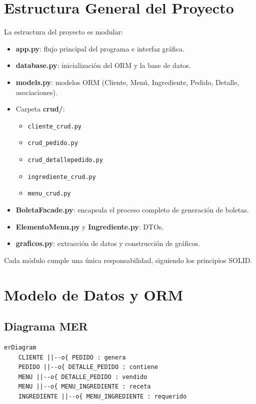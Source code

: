 \documentclass[11pt,letterpaper]{article}
\begin{document}
\section{Estructura General del Proyecto}

La estructura del proyecto es modular:

\begin{itemize}
    \item \textbf{app.py}: flujo principal del programa e interfaz gráfica.
    \item \textbf{database.py}: inicialización del ORM y la base de datos.
    \item \textbf{models.py}: modelos ORM (Cliente, Menú, Ingrediente, Pedido, Detalle, asociaciones).
    \item Carpeta \textbf{crud/}:
    \begin{itemize}
        \item \texttt{cliente\_crud.py}
        \item \texttt{crud\_pedido.py}
        \item \texttt{crud\_detallepedido.py}
        \item \texttt{ingrediente\_crud.py}
        \item \texttt{menu\_crud.py}
    \end{itemize}
    \item \textbf{BoletaFacade.py}: encapsula el proceso completo de generación de boletas.
    \item \textbf{ElementoMenu.py} y \textbf{Ingrediente.py}: DTOs.
    \item \textbf{graficos.py}: extracción de datos y construcción de gráficos.
\end{itemize}

Cada módulo cumple una única responsabilidad, siguiendo los principios SOLID.

\section{Modelo de Datos y ORM}

\subsection{Diagrama MER}

\begin{verbatim}
erDiagram
    CLIENTE ||--o{ PEDIDO : genera
    PEDIDO ||--o{ DETALLE_PEDIDO : contiene
    MENU ||--o{ DETALLE_PEDIDO : vendido
    MENU ||--o{ MENU_INGREDIENTE : receta
    INGREDIENTE ||--o{ MENU_INGREDIENTE : requerido
\end{verbatim}
\end{document}
